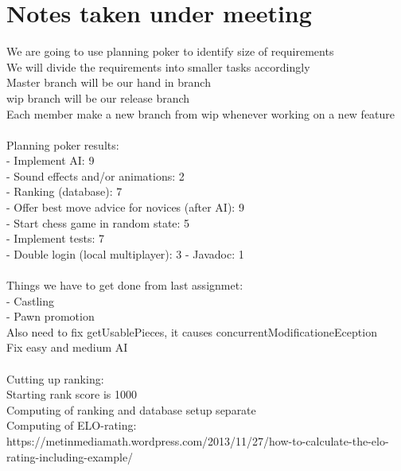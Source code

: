 \documentclass[letterpaper,11pt]{article}
\begin{document}
\section*{Notes taken under meeting}
We are going to use planning poker to identify size of requirements\\
We will divide the requirements into smaller tasks accordingly\\
Master branch will be our hand in branch\\
wip branch will be our release branch\\
Each member make a new branch from wip whenever working on a new feature\\\\
Planning poker results:\\
- Implement AI: 9\\
- Sound effects and/or animations: 2\\
- Ranking (database): 7\\
- Offer best move advice for novices (after AI): 9\\ 
- Start chess game in random state: 5\\
- Implement tests: 7\\
- Double login (local multiplayer): 3
- Javadoc: 1\\\\
Things we have to get done from last assignmet:\\
- Castling\\
- Pawn promotion\\
Also need to fix getUsablePieces, it causes concurrentModificationeEception\\
Fix easy and medium AI\\\\
Cutting up ranking:\\
Starting rank score is 1000\\
Computing of ranking and database setup separate\\
Computing of ELO-rating: https://metinmediamath.wordpress.com/2013/11/27/how-to-calculate-the-elo-rating-including-example/\\
\end{document}
